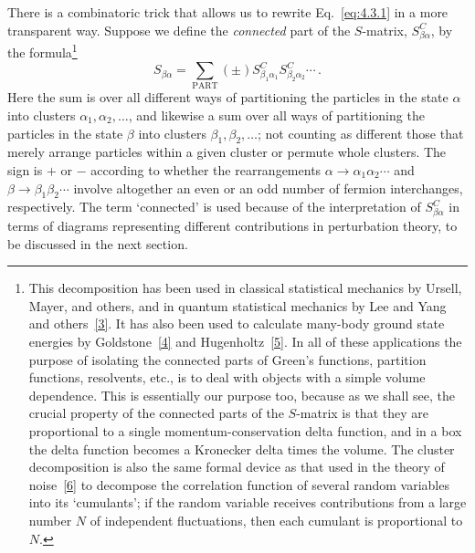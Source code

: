 There is a combinatoric trick that allows us to rewrite Eq.~\eqref{eq:4.3.1} in
a more transparent way. Suppose we define the \emph{connected} part of the
$S$-matrix, $S^C_{\beta\alpha}$, by the formula\footnote{This decomposition has
been used in classical statistical mechanics by Ursell, Mayer, and others, and
in quantum statistical mechanics by Lee and Yang and others~\hyperref[ref:4.3]{[3]}. It has also
been used to calculate many-body ground state energies by Goldstone~\hyperref[ref:4.4]{[4]} and
Hugenholtz~\hyperref[ref:4.5]{[5]}. In all of these applications the purpose of isolating the
connected parts of Green's functions, partition functions, resolvents, etc., is
to deal with objects with a simple volume dependence. This is essentially our
purpose too, because as we shall see, the crucial property of the connected
parts of the $S$-matrix is that they are proportional to a single
momentum-conservation delta function, and in a box the delta function becomes
a Kronecker delta times the volume. The cluster decomposition is also the same
formal device as that used in the theory of noise~\hyperref[ref:4.6]{[6]} to decompose the
correlation function of several random variables into its `cumulants'; if the
random variable receives contributions from a large number $N$ of independent
fluctuations, then each cumulant is proportional to $N$.}
\begin{equation}
S_{\beta\alpha}
=\sum_{\mathrm{PART}}(\pm)
 S^C_{\beta_1\alpha_1}S^C_{\beta_2\alpha_2}\cdots\,.
\tag{4.3.2}
\label{eq:4.3.2}
\end{equation}
Here the sum is over all different ways of partitioning the particles in
the state $\alpha$ into clusters $\alpha_1,\alpha_2,\ldots$, and likewise a sum
over all ways of partitioning the particles in the state $\beta$ into clusters
$\beta_1,\beta_2,\ldots$; not counting as different those that merely arrange
particles within a given cluster or permute whole clusters. The sign is $+$ or
$-$ according to whether the rearrangements
$\alpha\to\alpha_1\alpha_2\cdots$ and
$\beta\to\beta_1\beta_2\cdots$ involve altogether an even or an odd number of
fermion interchanges, respectively. The term `connected' is used because of
the interpretation of $S^C_{\beta\alpha}$ in terms of diagrams representing
different contributions in perturbation theory, to be discussed in the next
section.

